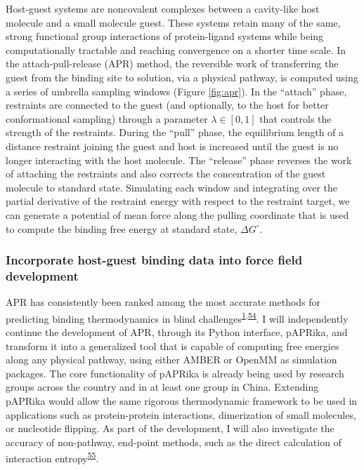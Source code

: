 \documentclass[11pt,notitlepage]{article}
\begin{document}
Host-guest systems are noncovalent complexes between a cavity-like host
molecule and a small molecule guest. These systems retain many of the
same, strong functional group interactions of protein-ligand systems
while being computationally tractable and reaching convergence on a
shorter time scale. In the attach-pull-release (APR) method, the
reversible work of transferring the guest from the binding site to
solution, via a physical pathway, is computed using a series of umbrella
sampling windows (Figure \ref{fig:apr}). In the ``attach'' phase,
restraints are connected to the guest (and optionally, to the host for
better conformational sampling) through a parameter
\(\lambda \in [0, 1]\) that controls the strength of the restraints.
During the ``pull'' phase, the equilibrium length of a distance
restraint joining the guest and host is increased until the guest is no
longer interacting with the host molecule. The ``release'' phase
reverses the work of attaching the restraints and also corrects the
concentration of the guest molecule to standard state. Simulating each
window and integrating over the partial derivative of the restraint
energy with respect to the restraint target, we can generate a potential
of mean force along the pulling coordinate that is used to compute the
binding free energy at standard state, \(\Delta G^\circ\).

\hypertarget{incorporate-host-guest-binding-data-into-force-field-development}{%
\subsubsection{Incorporate host-guest binding data into force field
development}\label{incorporate-host-guest-binding-data-into-force-field-development}}

APR has consistently been ranked among the most accurate methods for
predicting binding thermodynamics in blind
challenges\textsuperscript{\protect\hyperlink{ref-BGsUYQln}{1},\protect\hyperlink{ref-GA1AFcUw}{54}}.
I will independently continue the development of APR, through its Python
interface, pAPRika, and transform it into a generalized tool that is
capable of computing free energies along any physical pathway, using
either AMBER or OpenMM as simulation packages. The core functionality of
pAPRika is already being used by research groups across the country and
in at least one group in China. Extending pAPRika would allow the same
rigorous thermodynamic framework to be used in applications such as
protein-protein interactions, dimerization of small molecules, or
nucleotide flipping. As part of the development, I will also investigate
the accuracy of non-pathway, end-point methods, such as the direct
calculation of interaction
entropy\textsuperscript{\protect\hyperlink{ref-gRfhPG7N}{55}}.
\end{document}
